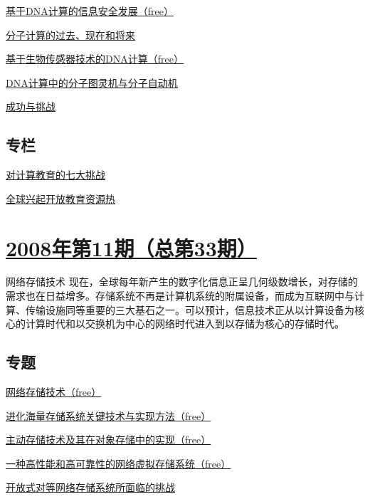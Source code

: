 \documentclass[a4paper]{article}
\begin{document}
\href{http://history.ccf.org.cn/resources/1190201776262/2010/04/15/034014.pdf}{基于DNA计算的信息安全发展（free）}

\href{http://history.ccf.org.cn/resources/1190201776262/2010/04/15/034023.pdf}{分子计算的过去、现在和将来}

\href{http://history.ccf.org.cn/resources/1190201776262/2010/04/15/034030.pdf}{基于生物传感器技术的DNA计算（free）}

\href{http://history.ccf.org.cn/resources/1190201776262/2010/04/15/034037.pdf}{DNA计算中的分子图灵机与分子自动机}

\href{http://history.ccf.org.cn/resources/1190201776262/2010/04/15/034044.pdf}{成功与挑战}

\subsection{专栏}
\href{http://history.ccf.org.cn/resources/1190201776262/2010/04/15/034048.pdf}{对计算教育的七大挑战}

\href{http://history.ccf.org.cn/resources/1190201776262/2010/04/15/034066.pdf}{全球兴起开放教育资源热}


\section{\href{http://history.ccf.org.cn/sites/ccf/jsjtbbd.jsp?contentId=2542567629016}{\textbf{2008年第11期（总第33期）}}}
网络存储技术 现在，全球每年新产生的数字化信息正呈几何级数增长，对存储的需求也在日益增多。存储系统不再是计算机系统的附属设备，而成为互联网中与计算、传输设施同等重要的三大基石之一。可以预计，信息技术正从以计算设备为核心的计算时代和以交换机为中心的网络时代进入到以存储为核心的存储时代。
\subsection{专题}
\href{http://history.ccf.org.cn/resources/1190201776262/2010/04/15/033016.pdf}{网络存储技术（free）}

\href{http://history.ccf.org.cn/resources/1190201776262/2010/04/15/033018.pdf}{进化海量存储系统关键技术与实现方法（free）}

\href{http://history.ccf.org.cn/resources/1190201776262/2010/04/15/033027.pdf}{主动存储技术及其在对象存储中的实现（free）}

\href{http://history.ccf.org.cn/resources/1190201776262/2010/04/15/033034.pdf}{一种高性能和高可靠性的网络虚拟存储系统（free）}

\href{http://history.ccf.org.cn/resources/1190201776262/2010/04/15/033044.pdf}{开放式对等网络存储系统所面临的挑战}
\end{document}

